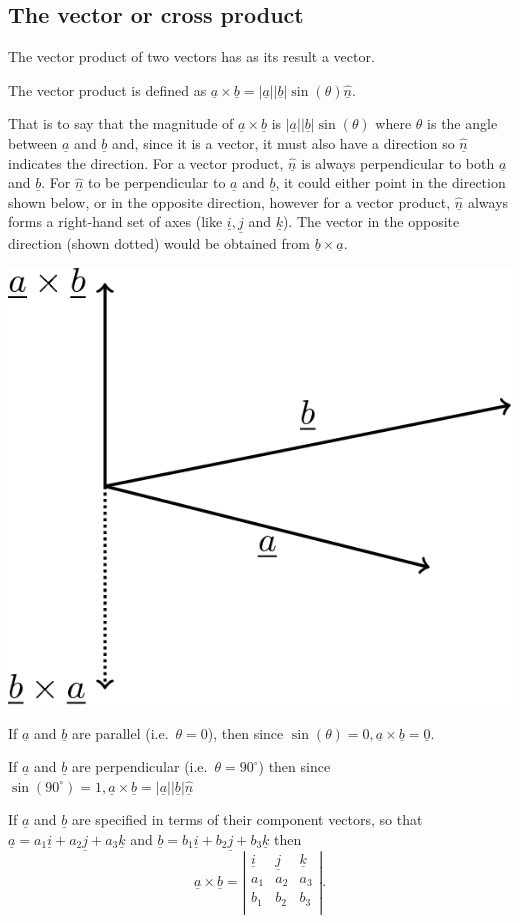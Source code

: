 \documentclass[
  11pt,
  oneside]{book}
\newcommand{\slide}{}
\theoremstyle{definition}
\theoremstyle{definition}
\theoremstyle{definition}
\theoremstyle{definition}
\theoremstyle{remark}
\begin{document}
\slide

\subsection{The vector or cross product}\label{the-vector-or-cross-product}

The vector product of two vectors has as its result a vector.

The vector product is defined as \(\underline a \times\underline b = |\underline a||\underline b|\sin(\theta)\underline{\hat n}\).

That is to say that the magnitude of \(\underline a\times\underline b\) is \(|\underline a||\underline b|\sin(\theta)\) where \(\theta\) is the angle between \(\underline a\) and \(\underline b\) and, since it is a vector, it must also have a direction so \(\underline{\hat n}\) indicates the direction. For a vector product, \(\underline {\hat n}\) is always perpendicular to both \(\underline a\) and \(\underline b\). For \(\underline {\hat n}\) to be perpendicular to \(\underline a\) and \(\underline b\), it could either point in the direction shown below, or in the opposite direction, however for a vector product, \(\underline {\hat n}\) always forms a right-hand set of axes (like \(\underline i, \underline j\) and \(\underline k\)). The vector in the opposite direction (shown dotted) would be obtained from \(\underline b\times\underline a\).

\begin{center}\includegraphics[width=0.35\linewidth]{tikztopng-figure63} \end{center}

If \(\underline a\) and \(\underline b\) are parallel (i.e.~\(\theta = 0\)), then since \(\sin(\theta) = 0, \underline a \times\underline b = {\underline 0}\).

If \(\underline a\) and \(\underline b\) are perpendicular (i.e.~\(\theta = 90^\circ\)) then since \(\sin(90^\circ)= 1, \underline a \times\underline b = |\underline a||\underline b|\underline {\hat n}\)

If \(\underline a\) and \(\underline b\) are specified in terms of their component vectors, so that \(\underline a = a_1\underline i + a_2\underline j + a_3\underline k\) and \(\underline b = b_1\underline i + b_2\underline j + b_3\underline k\) then
\[
\underline a \times\underline b = \left|\begin{array}{ccc}\underline i&\underline j&\underline k\\a_1&a_2&a_3\\b_1&b_2&b_3\\\end{array}\right|.
\]
\slide
\end{document}
